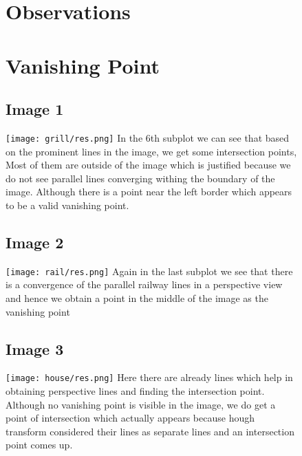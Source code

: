 \documentclass[12pt]{article}
\begin{document}
      \pagebreak
      

    \begin{figure}
    \section*{Observations}
    \section{Vanishing Point}
    \subsection{Image 1}
	\hspace{-3cm}
    \texttt{[image: grill/res.png]}
    In the 6th subplot we can see that based on the prominent lines in the image,
    we get some intersection points, Most of them are outside of the image which is justified because we do not see parallel lines converging withing the boundary of the image. Although there is a point near the left border which appears to be a valid vanishing point. 
	\end{figure}
   
    \begin{figure}  
    \subsection{Image 2}
	 \hspace{-3cm}
    \texttt{[image: rail/res.png]}
      Again in the last subplot we see that there is a convergence of the parallel railway lines in a perspective view and hence we obtain a point in the middle of the image as the vanishing point
	\end{figure}
  
     \begin{figure}  
    \subsection{Image 3}
	     \hspace{-3cm}
    \texttt{[image: house/res.png]}
    Here there are already lines which help in obtaining perspective lines and finding the intersection point. Although no vanishing point is visible in the image, we do get a point of intersection which actually appears because hough transform considered their lines as separate lines and an intersection point comes up.
	\end{figure}
\end{document}
